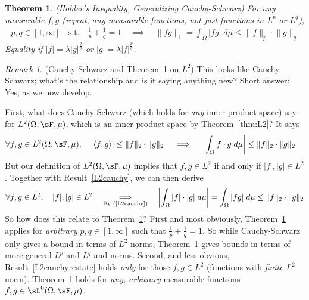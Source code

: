 \documentclass[12pt]{article}
\theoremstyle{plain}
\newtheorem{thm}{Theorem}[section]
\theoremstyle{definition}
\theoremstyle{remark}
\newtheorem*{rmk}{Remark}
\begin{document}
\begin{thm}
\label{thm:holder}
\emph{(Holder's Inequality, Generalizing Cauchy-Schwarz)}
For any measurable $f,g$ (repeat, \emph{any} measurable functions, not
just functions in $L^p$ or $L^q$),
\begin{align*}
  p,q\in[1,\infty]
  \quad \text{s.t.}\quad
  \frac{1}{p}
  +
  \frac{1}{q}
  =1
  \quad\implies\quad
  \lVert fg\rVert_1 =
  \int_\Omega |fg| \; d\mu \leq
  \lVert f\rVert_p \cdot \lVert g\rVert_{q}
\end{align*}
Equality if $|f|=\lambda |g|^{\frac{q}{p}}$ or
$|g|=\lambda |f|^{\frac{p}{q}}$.
\end{thm}
\begin{rmk}(Cauchy-Schwarz and Theorem~\ref{thm:holder} on $L^2$)
This looks like Cauchy-Schwarz; what's the relationship and is it saying
anything new?
Short answer: Yes, as we now develop.

First, what does Cauchy-Schwarz (which holds for \emph{any} inner
product space) say for $L^2(\Omega,\sF,\mu)$, which is an inner product
space by Theorem~\ref{thm:L2}? It says
\begin{align}
  \forall f,g\in L^2(\Omega,\sF,\mu),\quad
  |\langle f,g\rangle|
  \leq \lVert f\rVert_2\cdot \lVert g\rVert_2
  \quad\implies\quad
  \left|
  \int_\Omega f\cdot g\;d\mu
  \right|
  &\leq \lVert f\rVert_2\cdot \lVert g\rVert_2
  \label{L2cauchy}
\end{align}
But our definition of $L^2(\Omega,\sF,\mu)$ implies that $f,g\in L^2$
if and only if $|f|,|g|\in L^2$.
Together with Result~\ref{L2cauchy}, we can then derive
\begin{align}
  \forall f,g\in L^2,\quad
  |f|,|g|\in L^2
  \quad\underset{\text{By (\ref{L2cauchy})}}{\implies}\quad
  \left| \int_\Omega |f|\cdot |g|\;d\mu \right|
  = \int_\Omega |fg|\;d\mu
  \leq \lVert f\rVert_2\cdot \lVert g\rVert_2
  \label{L2cauchyrestate}
\end{align}
So how does this relate to Theorem~\ref{thm:holder}?
First and most obviously, Theorem~\ref{thm:holder} applies for
\emph{arbitrary} $p, q\in[1,\infty]$ such that
$\frac{1}{p}+\frac{1}{q}=1$. So while Cauchy-Schwarz only gives a bound
in terms of $L^2$ norms, Theorem~\ref{thm:holder} gives bounds in terms
of more general $L^p$ and $L^q$ and norms.
Second, and less obvious, Result~\ref{L2cauchyrestate} holds \emph{only}
for those $f,g\in L^2$ (functions with \emph{finite} $L^2$ norm).
Theorem~\ref{thm:holder} holds for \emph{any, arbitrary} measurable
functions $f,g\in\sL^0(\Omega,\sF,\mu)$.
\end{rmk}
\end{document}
